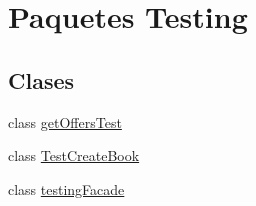 \hypertarget{namespace_testing}{}\section{Paquetes Testing}
\label{namespace_testing}
\subsection*{Clases}
\begin{DoxyCompactItemize}
\item 
class \mbox{\hyperlink{class_testing_1_1get_offers_test}{get\+Offers\+Test}}
\item 
class \mbox{\hyperlink{class_testing_1_1_test_create_book}{Test\+Create\+Book}}
\item 
class \mbox{\hyperlink{class_testing_1_1testing_facade}{testing\+Facade}}
\end{DoxyCompactItemize}

